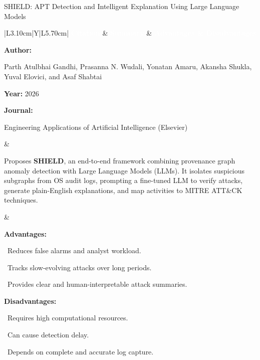 \documentclass[aspectratio=169,10pt]{beamer}
\newcommand{\lrhdr}{%
  \rowcolor{prismNavy}%
  {\scriptsize\textcolor{white}{\textbf{Citation}}} &
  {\scriptsize\textcolor{white}{\textbf{Summary}}} &
  {\scriptsize\textcolor{white}{\textbf{Advantages \& Disadvantages}}} \\}
\begin{document}
\begin{frame}[t]{SHIELD: APT Detection and Intelligent Explanation Using Large Language Models}
\vspace{-0.30em}
{\footnotesize\setlength{\tabcolsep}{3.5pt}\renewcommand{\arraystretch}{1.10}
\begin{tabularx}{\textwidth}{|L{3.10cm}|Y|L{5.70cm}|}
\hline\lrhdr\hline
\begin{minipage}[t]{\linewidth}\fontsize{7.2pt}{9.2pt}\raggedright\selectfont
\textbf{Author:}\par
Parth Atulbhai Gandhi, Prasanna N. Wudali, Yonatan Amaru, Akansha Shukla, Yuval Elovici, and Asaf Shabtai\par\vspace{4pt}
\textbf{Year:} 2026\par\vspace{4pt}
\textbf{Journal:}\par
Engineering Applications of Artificial Intelligence (Elsevier)\par\vspace{4pt}
\end{minipage}
&
\begin{minipage}[t]{\linewidth}\fontsize{7.2pt}{9.2pt}\raggedright\selectfont
Proposes \textbf{SHIELD}, an end-to-end framework combining provenance graph anomaly detection with Large Language Models (LLMs). It isolates suspicious subgraphs from OS audit logs, prompting a fine-tuned LLM to verify attacks, generate plain-English explanations, and map activities to MITRE ATT\&CK techniques.\par\vspace{4pt}
\end{minipage}
&
\begin{minipage}[t]{\linewidth}\fontsize{7.1pt}{8.8pt}\raggedright\selectfont
\textcolor{strengthGreen}{\textbf{Advantages:}}\par\vspace{1.3pt}
\textbullet~Reduces false alarms and analyst workload.\par\vspace{1.8pt}\textbullet~Tracks slow-evolving attacks over long periods.\par\vspace{1.8pt}\textbullet~Provides clear and human-interpretable attack summaries.\par\vspace{3.2pt}
\textcolor{limitRed}{\textbf{Disadvantages:}}\par\vspace{1.3pt}
\textbullet~Requires high computational resources.\par\vspace{1.8pt}\textbullet~Can cause detection delay.\par\vspace{1.8pt}\textbullet~Depends on complete and accurate log capture.\par\vspace{3pt}
\end{minipage} \\\hline
\end{tabularx}}
\end{frame}
\end{document}
